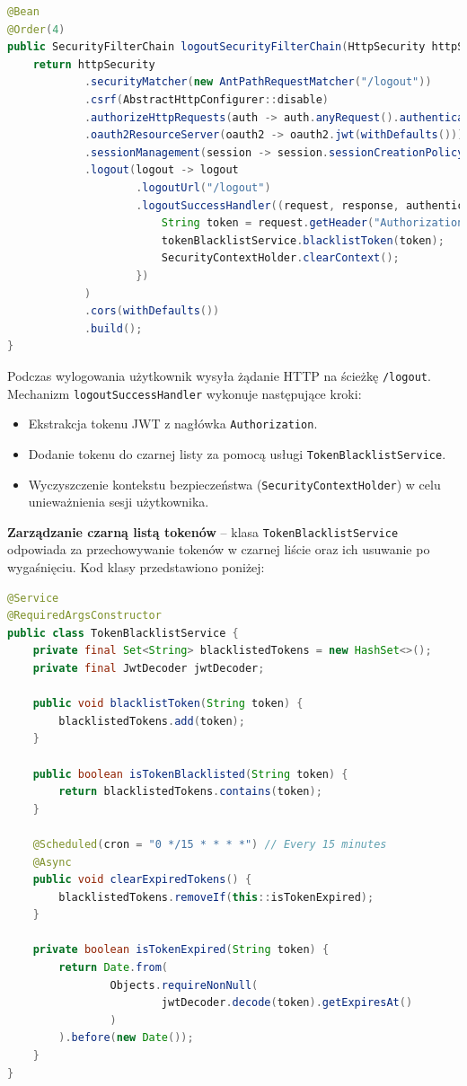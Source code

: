 \begin{lstlisting}[language=Java, style=JavaStyle, caption=Konfiguracja łańcucha wylogowania]
@Bean
@Order(4)
public SecurityFilterChain logoutSecurityFilterChain(HttpSecurity httpSecurity) throws Exception {
    return httpSecurity
            .securityMatcher(new AntPathRequestMatcher("/logout"))
            .csrf(AbstractHttpConfigurer::disable)
            .authorizeHttpRequests(auth -> auth.anyRequest().authenticated())
            .oauth2ResourceServer(oauth2 -> oauth2.jwt(withDefaults()))
            .sessionManagement(session -> session.sessionCreationPolicy(SessionCreationPolicy.STATELESS))
            .logout(logout -> logout
                    .logoutUrl("/logout")
                    .logoutSuccessHandler((request, response, authentication) -> {
                        String token = request.getHeader("Authorization").replace("Bearer ", "");
                        tokenBlacklistService.blacklistToken(token);
                        SecurityContextHolder.clearContext();
                    })
            )
            .cors(withDefaults())
            .build();
}
\end{lstlisting}

Podczas wylogowania użytkownik wysyła żądanie HTTP na ścieżkę \texttt{/logout}. Mechanizm \texttt{logoutSuccessHandler} wykonuje następujące kroki:
\begin{itemize}
    \item Ekstrakcja tokenu JWT z nagłówka \texttt{Authorization}.
    \item Dodanie tokenu do czarnej listy za pomocą usługi \texttt{TokenBlacklistService}.
    \item Wyczyszczenie kontekstu bezpieczeństwa (\texttt{SecurityContextHolder}) w celu unieważnienia sesji użytkownika.
\end{itemize}

\textbf{Zarządzanie czarną listą tokenów} -- klasa \texttt{TokenBlacklistService} odpowiada za przechowywanie tokenów w czarnej liście oraz ich usuwanie po wygaśnięciu. Kod klasy przedstawiono poniżej:

\begin{lstlisting}[language=Java, style=JavaStyle, caption=Klasa \texttt{TokenBlacklistService}]
@Service
@RequiredArgsConstructor
public class TokenBlacklistService {
    private final Set<String> blacklistedTokens = new HashSet<>();
    private final JwtDecoder jwtDecoder;

    public void blacklistToken(String token) {
        blacklistedTokens.add(token);
    }

    public boolean isTokenBlacklisted(String token) {
        return blacklistedTokens.contains(token);
    }

    @Scheduled(cron = "0 */15 * * * *") // Every 15 minutes
    @Async
    public void clearExpiredTokens() {
        blacklistedTokens.removeIf(this::isTokenExpired);
    }

    private boolean isTokenExpired(String token) {
        return Date.from(
                Objects.requireNonNull(
                        jwtDecoder.decode(token).getExpiresAt()
                )
        ).before(new Date());
    }
}
\end{lstlisting}

